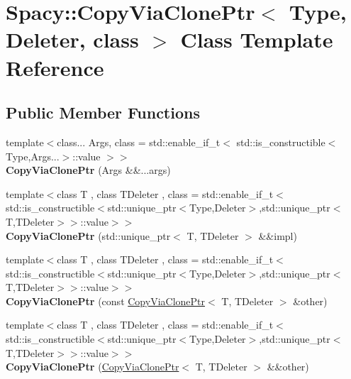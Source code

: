 \hypertarget{classSpacy_1_1CopyViaClonePtr}{}\section{Spacy\+:\+:Copy\+Via\+Clone\+Ptr$<$ Type, Deleter, class $>$ Class Template Reference}
\label{classSpacy_1_1CopyViaClonePtr}
\subsection*{Public Member Functions}
\begin{DoxyCompactItemize}
\item 
\hypertarget{classSpacy_1_1CopyViaClonePtr_aada109dd23432cbd5d05a5c2eaf00f7b}{}{\footnotesize template$<$class... Args, class  = std\+::enable\+\_\+if\+\_\+t$<$ std\+::is\+\_\+constructible$<$\+Type,\+Args...$>$\+::value $>$$>$ }\\{\bfseries Copy\+Via\+Clone\+Ptr} (Args \&\&...args)\label{classSpacy_1_1CopyViaClonePtr_aada109dd23432cbd5d05a5c2eaf00f7b}

\item 
\hypertarget{classSpacy_1_1CopyViaClonePtr_a8bb8bd921eb2148cb7787354bc3ebd40}{}{\footnotesize template$<$class T , class T\+Deleter , class  = std\+::enable\+\_\+if\+\_\+t$<$std\+::is\+\_\+constructible$<$std\+::unique\+\_\+ptr$<$\+Type,\+Deleter$>$,std\+::unique\+\_\+ptr$<$\+T,\+T\+Deleter$>$$>$\+::value$>$$>$ }\\{\bfseries Copy\+Via\+Clone\+Ptr} (std\+::unique\+\_\+ptr$<$ T, T\+Deleter $>$ \&\&impl)\label{classSpacy_1_1CopyViaClonePtr_a8bb8bd921eb2148cb7787354bc3ebd40}

\item 
\hypertarget{classSpacy_1_1CopyViaClonePtr_a85b1ba275ca0de2f6868c6337fc93b44}{}{\footnotesize template$<$class T , class T\+Deleter , class  = std\+::enable\+\_\+if\+\_\+t$<$std\+::is\+\_\+constructible$<$std\+::unique\+\_\+ptr$<$\+Type,\+Deleter$>$,std\+::unique\+\_\+ptr$<$\+T,\+T\+Deleter$>$$>$\+::value$>$$>$ }\\{\bfseries Copy\+Via\+Clone\+Ptr} (const \hyperlink{classSpacy_1_1CopyViaClonePtr}{Copy\+Via\+Clone\+Ptr}$<$ T, T\+Deleter $>$ \&other)\label{classSpacy_1_1CopyViaClonePtr_a85b1ba275ca0de2f6868c6337fc93b44}

\item 
\hypertarget{classSpacy_1_1CopyViaClonePtr_ad8bf99fea38aaae2834f01d047f3b3eb}{}{\footnotesize template$<$class T , class T\+Deleter , class  = std\+::enable\+\_\+if\+\_\+t$<$std\+::is\+\_\+constructible$<$std\+::unique\+\_\+ptr$<$\+Type,\+Deleter$>$,std\+::unique\+\_\+ptr$<$\+T,\+T\+Deleter$>$$>$\+::value$>$$>$ }\\{\bfseries Copy\+Via\+Clone\+Ptr} (\hyperlink{classSpacy_1_1CopyViaClonePtr}{Copy\+Via\+Clone\+Ptr}$<$ T, T\+Deleter $>$ \&\&other)\label{classSpacy_1_1CopyViaClonePtr_ad8bf99fea38aaae2834f01d047f3b3eb}


\end{DoxyCompactItemize}
